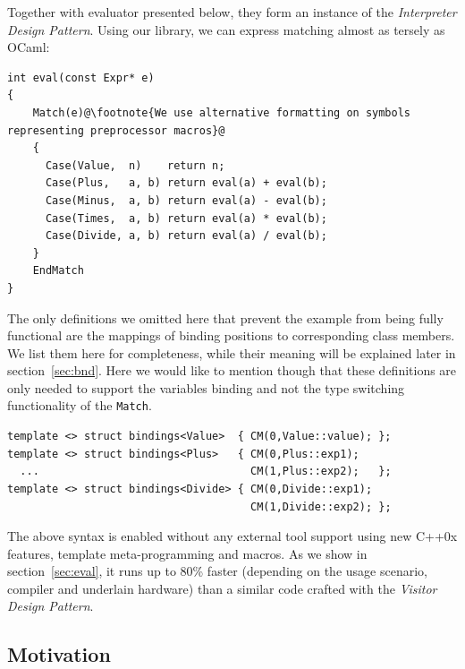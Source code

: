 \documentclass[preprint]{sigplanconf}
\makeatletter
\DeclareRobustCommand{\code}[1]{{\lstinline[breaklines=false,escapechar=@]{#1}}}
\makeatother
\begin{document}
Together with evaluator presented below, they form an instance of the 
\emph{Interpreter Design Pattern}\cite{DesignPatterns1993}.
Using our library, we can express matching
almost as tersely as OCaml:

\begin{lstlisting}[keepspaces,columns=flexible]
int eval(const Expr* e)
{
    Match(e)@\footnote{We use alternative formatting on symbols representing preprocessor macros}@
    {
      Case(Value,  n)    return n;
      Case(Plus,   a, b) return eval(a) + eval(b);
      Case(Minus,  a, b) return eval(a) - eval(b);
      Case(Times,  a, b) return eval(a) * eval(b);
      Case(Divide, a, b) return eval(a) / eval(b);
    }
    EndMatch
}
\end{lstlisting}

The only definitions we omitted here that prevent the example from being fully 
functional are the mappings of binding positions to corresponding class members. 
We list them here for completeness, while their meaning will be explained later 
in section~\ref{sec:bnd}. Here we would like to mention though that these 
definitions are only needed to support the variables binding and not the type 
switching functionality of the \code{Match}.

\begin{lstlisting}[keepspaces,columns=flexible]
template <> struct bindings<Value>  { CM(0,Value::value); };
template <> struct bindings<Plus>   { CM(0,Plus::exp1); 
  ...                                 CM(1,Plus::exp2);   };
template <> struct bindings<Divide> { CM(0,Divide::exp1); 
                                      CM(1,Divide::exp2); };
\end{lstlisting}

The above syntax is enabled without any external tool support using new C++0x 
features\cite{C++0x}, template meta-programming and macros. As we 
show in section~\ref{sec:eval}, it runs up to 80\% faster (depending on the usage 
scenario, compiler and underlain hardware) than a similar code crafted with the 
\emph{Visitor Design Pattern}.

\subsection{Motivation}

\end{document}
